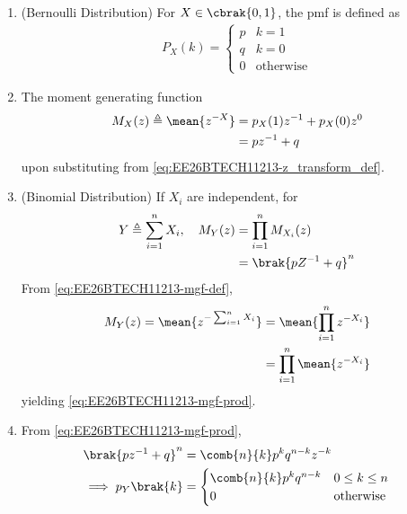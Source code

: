 \begin{enumerate}[label=\thesubsection.\arabic*,ref=\thesubsection.\theenumi]
	\item (Bernoulli Distribution)
		For $X \in \cbrak{0,1}$, the pmf is defined as
        \begin{align}
            P_{X}(k)=
                \begin{cases}
                    p &  k=1 \\
                    q & k=0\\
		    0 & \text{otherwise}
                \end{cases}
        \end{align}
\item The moment generating function 
\begin{align}
\begin{split}
	M_{X}(z)\triangleq \mean{z^{-X}} &= p_{X}(1)z^{-1} +p_{X}(0)z^{0}\\
    				&=pz^{-1}+q
\end{split}
\label{eq:EE26BTECH11213-mgf-def}
        \end{align}
	upon substituting from \eqref{eq:EE26BTECH11213-z_transform_def}.
\item 
(Binomial Distribution)	If $X_i$ are independent,  for
\begin{align}
\begin{split}
	Y \triangleq \sum_{i=1}^{n}X_i, \quad 
	M_{Y}(z)&=\prod_{i=1}^{n}M_{X_i}(z)        \\
	&=\brak{pZ^{-1}+q}^n
\end{split}
\label{eq:EE26BTECH11213-mgf-prod}
\end{align}
\solution 
From \eqref{eq:EE26BTECH11213-mgf-def},
\begin{align}
	M_{Y}(z)=\mean{z^{-\sum_{i=1}^{n}X_i}}
	&=\mean{\prod_{i=1}^{n}z^{-X_{i}}}
	\\
	&=\prod_{i=1}^{n}\mean{z^{-X_{i}}}
\end{align}
yielding \eqref{eq:EE26BTECH11213-mgf-prod}.
\item From  
\eqref{eq:EE26BTECH11213-mgf-prod},
\begin{align}
	\brak{pz^{-1}+q}^n &= \comb{n}{k}p^kq^{n-k}z^{-k}
	\\
         \implies    p_Y\brak{k}&=
	 \begin{cases}
		 \comb{n}{k}p^kq^{n-k} & 0 \le k \le n \\
		 0 & \text{otherwise}
 \end{cases}

\end{align}
\end{enumerate}
